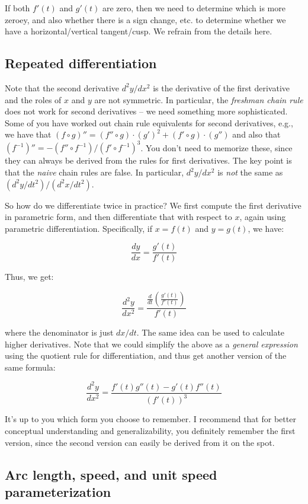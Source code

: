 \documentclass[10pt]{amsart}
\begin{document}
If both $f'(t)$ and $g'(t)$ are zero, then we need to determine which
is more zeroey, and also whether there is a sign change, etc. to
determine whether we have a horizontal/vertical tangent/cusp. We
refrain from the details here.
\subsection{Repeated differentiation}

Note that the second derivative $d^2y/dx^2$ is the derivative of the
first derivative and the roles of $x$ and $y$ are not symmetric. In
particular, the {\em freshman chain rule} does not work for second
derivatives -- we need something more sophisticated. Some of you have
worked out chain rule equivalents for second derivatives, e.g., we
have that $(f \circ g)'' = (f'' \circ g) \cdot (g')^2 + (f' \circ g)
\cdot (g'')$ and also that $(f^{-1})'' = -(f'' \circ f^{-1})/(f' \circ
f^{-1})^3$. You don't need to memorize these, since they can always be
derived from the rules for first derivatives. The key point is that
the {\em naive} chain rules are false. In particular, $d^2y/dx^2$ is
{\em not} the same as $(d^2y/dt^2)/(d^2x/dt^2)$.

So how do we differentiate twice in practice? We first compute the
first derivative in parametric form, and then differentiate that with
respect to $x$, again using parametric differentiation. Specifically,
if $x = f(t)$ and $y = g(t)$, we have:

$$\frac{dy}{dx} = \frac{g'(t)}{f'(t)}$$

Thus, we get:

$$\frac{d^2y}{dx^2} = \frac{\frac{d}{dt}\left(\frac{g'(t)}{f'(t)}\right)}{f'(t)}$$

where the denominator is just $dx/dt$. The same idea can be used to
calculate higher derivatives. Note that we could simplify the above as
a {\em general expression} using the quotient rule for
differentiation, and thus get another version of the same formula:

$$\frac{d^2y}{dx^2} = \frac{f'(t)g''(t) - g'(t)f''(t)}{(f'(t))^3}$$

It's up to you which form you choose to remember. I recommend that for
better conceptual understanding and generalizability, you definitely
remember the first version, since the second version can easily be
derived from it on the spot.

\subsection{Arc length, speed, and unit speed parameterization}
\end{document}
